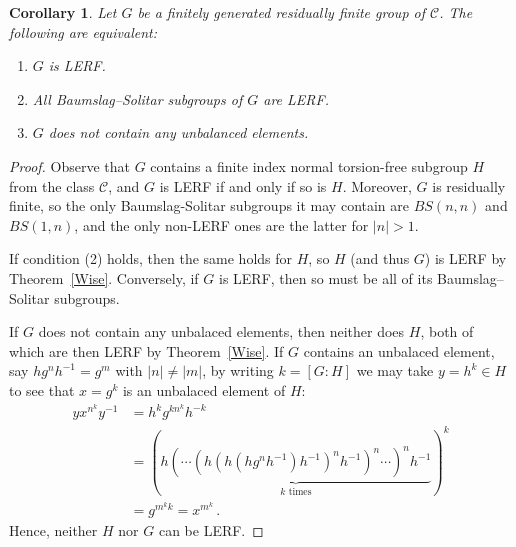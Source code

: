 \documentclass[10pt,a4paper]{amsart}
\newtheorem{cor}{Corollary}
\begin{document}
\begin{cor}\label{RF-LERF} Let \(G\) be a finitely generated residually finite group of \(\mathcal{C}\). The following are equivalent:
\begin{enumerate}
    \item \(G\) is LERF.
    \item All Baumslag--Solitar subgroups of \(G\) are LERF.
    \item \(G\) does not contain any unbalanced elements.
\end{enumerate}
\end{cor}

\begin{proof} Observe that \(G\) contains a finite index normal torsion-free subgroup \(H\) from the class \(\mathcal{C}\), and \(G\) is LERF if and only if so is \(H\). Moreover, \(G\) is residually finite, so the only Baumslag-Solitar subgroups it may contain are \(BS(n,n)\) and \(BS(1,n)\), and the only non-LERF ones are the latter for \(|n| > 1\).

If condition (2) holds, then the same holds for \(H\), so \(H\) (and thus \(G\)) is LERF by Theorem~\ref{Wise}. Conversely, if \(G\) is LERF, then so must be all of its Baumslag--Solitar subgroups.

If \(G\) does not contain any unbalaced elements, then neither does \(H\), both of which are then LERF by Theorem~\ref{Wise}. If \(G\) contains an unbalaced element, say \(hg^nh^{-1} = g^m\) with \(|n| \neq |m|\), by writing \(k = [G\colon H]\) we may take \(y = h^k \in H\) to see that \(x = g^k\) is an unbalaced element of \(H\):
\begin{align*}
    yx^{n^k}y^{-1} &= h^kg^{kn^k}h^{-k}\\
    &= \left(\underbrace{h(\cdots (h(h(hg^nh^{-1})h^{-1})^nh^{-1})^n\cdots )^nh^{-1}}_{k \text{ times}}\right)^k\\
    &= g^{m^kk} = x^{m^k}\,.
\end{align*}
Hence, neither \(H\) nor \(G\) can be LERF.
\end{proof}
\end{document}
